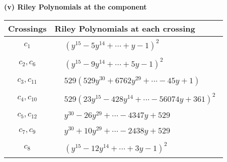 \documentclass[1p]{elsarticle_modified}
\theoremstyle{definition}
\begin{document}
\newpage\renewcommand{\arraystretch}{1}
\flushleft \textbf{(v) Riley Polynomials at the component}\newline \\
\begin{tabular}{m{50pt}|m{274pt}}
Crossings & \hspace{64pt}Riley Polynomials at each crossing \\
\hline $$\begin{aligned}c_{1}\end{aligned}$$&$\begin{aligned}
&(y^{15}-5 y^{14}+\cdots+y-1)^{2}
\end{aligned}$\\
\hline $$\begin{aligned}c_{2},c_{6}\end{aligned}$$&$\begin{aligned}
&(y^{15}-9 y^{14}+\cdots+5 y-1)^{2}
\end{aligned}$\\
\hline $$\begin{aligned}c_{3},c_{11}\end{aligned}$$&$\begin{aligned}
&529(529 y^{30}+6762 y^{29}+\cdots-45 y+1)
\end{aligned}$\\
\hline $$\begin{aligned}c_{4},c_{10}\end{aligned}$$&$\begin{aligned}
&529(23 y^{15}-428 y^{14}+\cdots-56074 y+361)^{2}
\end{aligned}$\\
\hline $$\begin{aligned}c_{5},c_{12}\end{aligned}$$&$\begin{aligned}
&y^{30}-26 y^{29}+\cdots-4347 y+529
\end{aligned}$\\
\hline $$\begin{aligned}c_{7},c_{9}\end{aligned}$$&$\begin{aligned}
&y^{30}+10 y^{29}+\cdots-2438 y+529
\end{aligned}$\\
\hline $$\begin{aligned}c_{8}\end{aligned}$$&$\begin{aligned}
&(y^{15}-12 y^{14}+\cdots+3 y-1)^{2}
\end{aligned}$\\
\hline
\end{tabular}\\~\\
\end{document}

